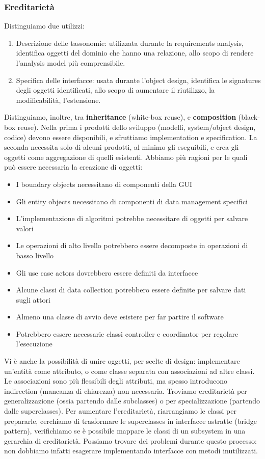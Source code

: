 \documentclass[11pt]{article}
\begin{document}
\subsubsection{Ereditarietà}
Distinguiamo due utilizzi:
\begin{enumerate}
    \item Descrizione delle tassonomie: utilizzata durante la requirements analysis, identifica oggetti del dominio che hanno una relazione, allo scopo di rendere l'analysis model più comprensibile. 
    \item Specifica delle interfacce: usata durante l'object design, identifica le signatures degli oggetti identificati, allo scopo di aumentare il riutilizzo, la modificabilità, l'estensione.
\end{enumerate}
Distinguiamo, inoltre, tra \textbf{inheritance} (white-box reuse), e \textbf{composition} (black-box reuse). Nella prima i prodotti dello sviluppo (modelli, system/object design, codice) devono essere disponibili, e sfruttiamo implementation e specification. La seconda necessita solo di alcuni prodotti, al minimo gli eseguibili, e crea gli oggetti come aggregazione di quelli esistenti. Abbiamo più ragioni per le quali può essere necessaria la creazione di oggetti:
\begin{itemize}
    \item I boundary objects necessitano di componenti della GUI 
    \item Gli entity objects necessitano di componenti di data management specifici 
    \item L'implementazione di algoritmi potrebbe necessitare di oggetti per salvare valori 
    \item Le operazioni di alto livello potrebbero essere decomposte in operazioni di basso livello 
    \item Gli use case actors dovrebbero essere definiti da interfacce 
    \item Alcune classi di data collection potrebbero essere definite per salvare dati sugli attori 
    \item Almeno una classe di avvio deve esistere per far partire il software
    \item Potrebbero essere necessarie classi controller e coordinator per regolare l'esecuzione 
\end{itemize}
Vi è anche la possibilità di unire oggetti, per scelte di design: implementare un'entità come attributo, o come classe separata con associazioni ad altre classi. Le associazioni sono più flessibili degli attributi, ma spesso introducono indirection (mancanza di chiarezza) non necessaria. Troviamo ereditarietà per generalizzazione (ossia partendo dalle subclasses) o per specializzazione (partendo dalle superclasses). Per aumentare l'ereditarietà, riarrangiamo le classi per prepararle, cerchiamo di trasformare le superclasses in interfacce astratte (bridge pattern), verifichiamo se è possibile mappare le classi di un subsystem in una gerarchia di ereditarietà. Possiamo trovare dei problemi durante questo processo: non dobbiamo infatti esagerare implementando interfacce con metodi inutilizzati.
\end{document}
